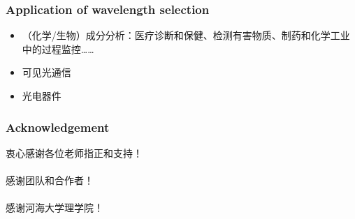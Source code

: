 \begin{frame}[c]
    \frametitle{Application of wavelength selection}

    \begin{itemize}
        \item （化学/生物）成分分析：医疗诊断和保健、检测有害物质、制药和化学工业中的过程监控……
        \item 可见光通信
        \item 光电器件
    \end{itemize}

\end{frame}

\begin{frame}[c]
    \frametitle{Acknowledgement}
    \Large{\begin{center}
            衷心感谢各位老师指正和支持！\\
            ~\\
            感谢团队和合作者！\\
            ~\\
            感谢河海大学理学院！\\
        \end{center}}

\end{frame}